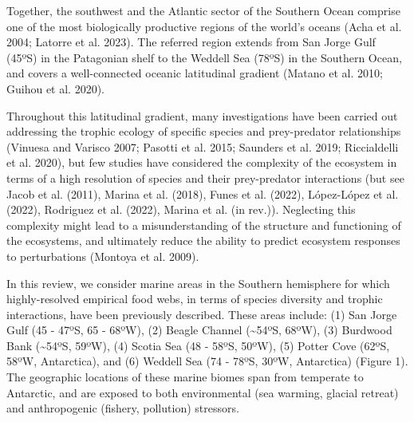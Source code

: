 \documentclass[
]{article}
\begin{document}
Together, the southwest and the Atlantic sector of the Southern Ocean
comprise one of the most biologically productive regions of the world's
oceans (Acha et al. 2004; Latorre et al. 2023). The referred region
extends from San Jorge Gulf (45ºS) in the Patagonian shelf to the
Weddell Sea (78ºS) in the Southern Ocean, and covers a well-connected
oceanic latitudinal gradient (Matano et al. 2010; Guihou et al. 2020).

Throughout this latitudinal gradient, many investigations have been
carried out addressing the trophic ecology of specific species and
prey-predator relationships (Vinuesa and Varisco 2007; Pasotti et al.
2015; Saunders et al. 2019; Riccialdelli et al. 2020), but few studies
have considered the complexity of the ecosystem in terms of a high
resolution of species and their prey-predator interactions (but see
Jacob et al. (2011), Marina et al. (2018), Funes et al. (2022),
López-López et al. (2022), Rodriguez et al. (2022), Marina et al. (in
rev.)). Neglecting this complexity might lead to a misunderstanding of
the structure and functioning of the ecosystems, and ultimately reduce
the ability to predict ecosystem responses to perturbations (Montoya et
al. 2009).

In this review, we consider marine areas in the Southern hemisphere for
which highly-resolved empirical food webs, in terms of species diversity
and trophic interactions, have been previously described. These areas
include: (1) San Jorge Gulf (45 - 47ºS, 65 - 68ºW), (2) Beagle Channel
(\textasciitilde54ºS, 68ºW), (3) Burdwood Bank (\textasciitilde54ºS,
59ºW), (4) Scotia Sea (48 - 58ºS, 50ºW), (5) Potter Cove (62ºS, 58ºW,
Antarctica), and (6) Weddell Sea (74 - 78ºS, 30ºW, Antarctica) (Figure
1). The geographic locations of these marine biomes span from temperate
to Antarctic, and are exposed to both environmental (sea warming,
glacial retreat) and anthropogenic (fishery, pollution) stressors.
\end{document}
